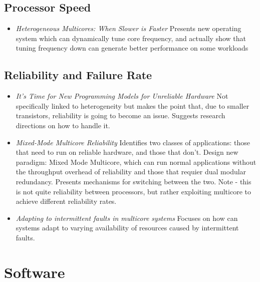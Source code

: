 \subsection{Processor Speed}
\begin{itemize}
\item \emph{Heterogeneous Multicores: When Slower is Faster}
Presents new operating system which can dynamically tune core
frequency, and actually show that tuning frequency down
can generate better performance on some workloads \cite{HBT}
\end{itemize}
\subsection{Reliability and Failure Rate}
\begin{itemize}
\item \emph{It's Time for New Programming Models for Unreliable Hardware }
Not specifically linked to heterogeneity but makes the point that, due
to smaller transistors, reliability is going to become an issue. Suggests
research directions on how to handle it. \cite{FSC}
\item \emph{Mixed-Mode Multicore Reliability} Identifies two classes
of applications: those that need to run on reliable hardware, and those
 that don't. Design new paradigm: Mixed Mode Multicore, which can
run normal applications without the throughput overhead of reliability
and those that requier dual modular redundancy. Presents mechanisms
for switching between the two. Note - this is not quite
reliability between processors, but rather exploiting multicore
to achieve different reliability rates. \cite{WCS:09}
\item \emph{Adapting to intermittent faults in multicore systems}
Focuses on how can systems adapt to varying availability of resources
caused by intermittent faults. \cite{WCS:08}
\end{itemize}

\section{Software}

